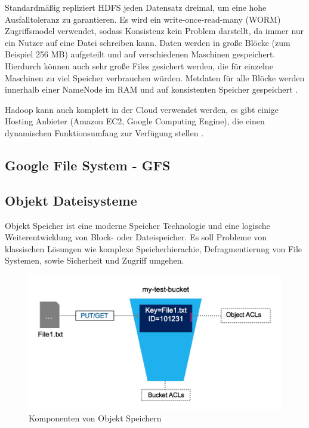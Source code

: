 Standardmäßig repliziert HDFS jeden Datensatz dreimal, um eine hohe Ausfalltoleranz zu garantieren. Es wird ein  write-once-read-many (\ac{WORM}) Zugriffsmodel verwendet, sodass Konsistenz kein Problem darstellt, da immer nur ein Nutzer auf eine Datei schreiben kann. Daten werden in große Blöcke (zum Beispiel 256 MB) aufgeteilt und auf verschiedenen Maschinen gespeichert. Hierdurch können auch sehr große Files gesichert werden, die für einzelne Maschinen zu viel Speicher verbrauchen würden. Metdaten für alle Blöcke werden innerhalb einer NameNode im RAM und auf konsistenten Speicher gespeichert  \parencite[Kap. I,2]{alapati.2016}.

Hadoop kann auch komplett in der Cloud verwendet werden, es gibt einige Hosting Anbieter (Amazon EC2, Google Computing Engine), die einen dynamischen Funktionsumfang zur Verfügung stellen \parencite[Kap. I, 1]{alapati.2016}.

\subsection{Google File System - GFS} 
\subsection{Objekt Dateisysteme} \label{subsec:objectstorage}

Objekt Speicher ist eine moderne Speicher Technologie und eine logische Weiterentwicklung von Block- oder Dateispeicher. Es soll Probleme von klassischen Lösungen wie komplexe Speicherhierachie, Defragmentierung von File Systemen, sowie Sicherheit und Zugriff umgehen.

\begin{figure}[hbt]
	\centering
	\includegraphics[scale=0.4]{images/object-storage}
	\caption{Komponenten von Objekt Speichern \parencite[S. 5]{Rios.2017}}
	\label{fig:objectstorage}
\end{figure}

